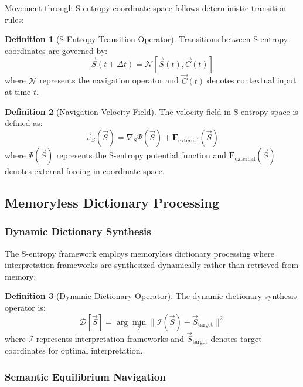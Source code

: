 \documentclass[12pt,a4paper]{article}
\theoremstyle{definition}
\newtheorem{definition}{Definition}[section]
\begin{document}
Movement through S-entropy coordinate space follows deterministic transition rules:

\begin{definition}[S-Entropy Transition Operator]
Transitions between S-entropy coordinates are governed by:
\begin{equation}
\vec{S}(t+\Delta t) = \mathcal{N}[\vec{S}(t), \vec{C}(t)]
\end{equation}
where $\mathcal{N}$ represents the navigation operator and $\vec{C}(t)$ denotes contextual input at time $t$.
\end{definition}

\begin{definition}[Navigation Velocity Field]
The velocity field in S-entropy space is defined as:
\begin{equation}
\vec{v}_S(\vec{S}) = \nabla_S \Psi(\vec{S}) + \mathbf{F}_{\text{external}}(\vec{S})
\end{equation}
where $\Psi(\vec{S})$ represents the S-entropy potential function and $\mathbf{F}_{\text{external}}(\vec{S})$ denotes external forcing in coordinate space.
\end{definition}

\subsection{Memoryless Dictionary Processing}

\subsubsection{Dynamic Dictionary Synthesis}

The S-entropy framework employs memoryless dictionary processing where interpretation frameworks are synthesized dynamically rather than retrieved from memory:

\begin{definition}[Dynamic Dictionary Operator]
The dynamic dictionary synthesis operator is:
\begin{equation}
\mathcal{D}[\vec{S}] = \arg\min_{\mathcal{I}} \|\mathcal{I}(\vec{S}) - \vec{S}_{\text{target}}\|^2
\end{equation}
where $\mathcal{I}$ represents interpretation frameworks and $\vec{S}_{\text{target}}$ denotes target coordinates for optimal interpretation.
\end{definition}

\subsubsection{Semantic Equilibrium Navigation}
\end{document}
